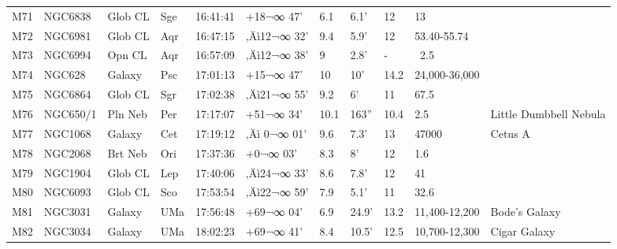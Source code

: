\documentclass[10pt,twoside,a4paper,english]{report}
\begin{document}
\begin{longtable}{@{}lllllllllll@{}}
M71        & NGC6838     & Glob CL    & Sge       & 16:41:41 & +18¬∞ 47'  & 6.1       & 6.1'                 & 12       & 13                  &                                           \\ 
M72        & NGC6981     & Glob CL    & Aqr       & 16:47:15 & ‚Äì12¬∞ 32'  & 9.4       & 5.9'                 & 12       & 53.40-55.74         &                                           \\ 
M73        & NGC6994     & Opn CL     & Aqr       & 16:57:09 & ‚Äì12¬∞ 38'  & 9         & 2.8'                 & -        & ~2.5                &                                           \\ 
M74        & NGC628      & Galaxy     & Psc       & 17:01:13 & +15¬∞ 47'  & 10        & 10'                  & 14.2     & 24,000-36,000       &                                           \\ 
M75        & NGC6864     & Glob CL    & Sgr       & 17:02:38 & ‚Äì21¬∞ 55'  & 9.2       & 6'                   & 11       & 67.5                &                                           \\ 
M76        & NGC650/1    & Pln Neb    & Per       & 17:17:07 & +51¬∞ 34'  & 10.1      & 163''                & 10.4     & 2.5                 & Little Dumbbell Nebula                    \\ 
M77        & NGC1068     & Galaxy     & Cet       & 17:19:12 & ‚Äì 0¬∞ 01'  & 9.6       & 7.3'                 & 13       & 47000               & Cetus A                                   \\ 
M78        & NGC2068     & Brt Neb    & Ori       & 17:37:36 & +0¬∞ 03'   & 8.3       & 8'                   & 12       & 1.6                 &                                           \\ 
M79        & NGC1904     & Glob CL    & Lep       & 17:40:06 & ‚Äì24¬∞ 33'  & 8.6       & 7.8'                 & 12       & 41                  &                                           \\ 
M80        & NGC6093     & Glob CL    & Sco       & 17:53:54 & ‚Äì22¬∞ 59'  & 7.9       & 5.1'                 & 11       & 32.6                &                                           \\ 
M81        & NGC3031     & Galaxy     & UMa       & 17:56:48 & +69¬∞ 04'  & 6.9       & 24.9'                & 13.2     & 11,400-12,200       & Bode's Galaxy                             \\ 
M82        & NGC3034     & Galaxy     & UMa       & 18:02:23 & +69¬∞ 41'  & 8.4       & 10.5'                & 12.5     & 10,700-12,300       & Cigar Galaxy                              \\ 

\end{longtable}
\end{document}
